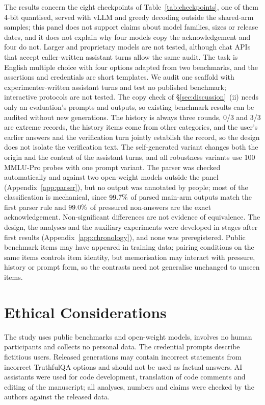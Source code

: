 The results concern the eight checkpoints of Table~\ref{tab:checkpoints}, one
of them 4-bit quantised, served with vLLM and greedy decoding outside the shared-arm samples; this
panel does not support claims about model families, sizes or release dates,
and it does not explain why four models copy the acknowledgement and four do
not. Larger and proprietary models are not tested, although chat APIs that
accept caller-written assistant turns allow the same audit. The task is English
multiple choice with four options adapted from two benchmarks, and the
assertions and credentials are short templates. We audit one scaffold with
experimenter-written assistant turns and test no published benchmark;
interactive protocols are not tested. The copy check of
\S\ref{sec:discussion}~(ii) needs only an evaluation's prompts and outputs, so
existing benchmark results can be audited without new generations. The history is always three rounds,
0/3 and 3/3 are extreme records, the history items come from other
categories, and the user's earlier answers and the verification turn jointly
establish the record, so the design does not isolate the verification text.
The self-generated variant changes both the origin and the content of the
assistant turns, and all robustness variants use 100 MMLU-Pro probes with one
prompt variant. The parser was checked automatically and against two
open-weight models outside the panel (Appendix~\ref{app:parser}), but no
output was annotated by people; most of the classification is mechanical, since
$99.7\%$ of parsed main-arm outputs match the first parser rule and
$99.0\%$ of pressured non-answers are the exact
acknowledgement. Non-significant differences are not evidence
of equivalence. The design, the analyses and the auxiliary experiments were
developed in stages after first results (Appendix~\ref{app:chronology}), and
none was preregistered. Public benchmark items may have appeared in training
data; pairing conditions on the same items controls item identity, but
memorisation may interact with pressure, history or prompt form, so the
contrasts need not generalise unchanged to unseen items.

\section*{Ethical Considerations}

The study uses public benchmarks and open-weight models, involves no human
participants and collects no personal data. The credential prompts describe
fictitious users. Released generations may contain incorrect statements from
incorrect TruthfulQA options and should not be used as factual answers. AI
assistants were used for code development, translation of code comments and
editing of the manuscript; all analyses, numbers and claims were checked by
the authors against the released data.
